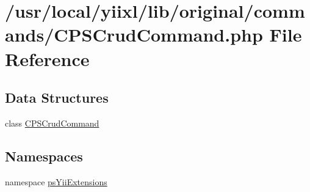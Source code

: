 \hypertarget{CPSCrudCommand_8php}{
\section{/usr/local/yiixl/lib/original/commands/CPSCrudCommand.php File Reference}
\label{CPSCrudCommand_8php}
}
\subsection*{Data Structures}
\begin{DoxyCompactItemize}
\item 
class \hyperlink{classCPSCrudCommand}{CPSCrudCommand}
\end{DoxyCompactItemize}
\subsection*{Namespaces}
\begin{DoxyCompactItemize}
\item 
namespace \hyperlink{namespacepsYiiExtensions}{psYiiExtensions}
\end{DoxyCompactItemize}
